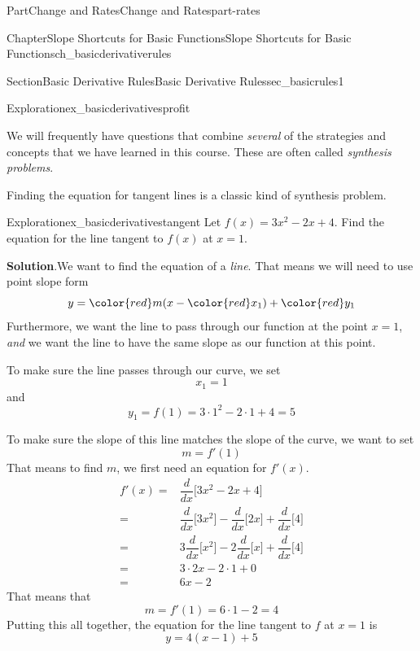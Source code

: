 \documentclass[oneside,10pt,]{tufte-book}
\newcommand{\blocktitlefont}{\relax}
\numberwithin{equation}{chapter}
\newcommand{\red}[1]{   {\color{red}   #1}   }
\newcommand{\ddx}[1]{ \dfrac{d}{dx} \Big[ #1 \Big]  }
\newcommand{\amp}{&}
\begin{document}
\begin{partptx}{Part}{Change and Rates}{}{Change and Rates}{}{}{part-rates}
\begin{chapterptx}{Chapter}{Slope Shortcuts for Basic Functions}{}{Slope Shortcuts for Basic Functions}{}{}{ch_basicderivativerules}
\begin{sectionptx}{Section}{Basic Derivative Rules}{}{Basic Derivative Rules}{}{}{sec_basicrules1}
\begin{exploration}{Exploration}{}{ex_basicderivativesprofit}
\end{exploration}%
We will frequently have questions that combine \emph{several} of the strategies and concepts that we have learned in this course.  These are often called \emph{synthesis problems}.%
\par
Finding the equation for tangent lines is a classic kind of synthesis problem.%
\begin{exploration}{Exploration}{}{ex_basicderivativestangent}%
Let \(f(x) = 3x^2 - 2x + 4\). Find the equation for the line tangent to \(f(x)\) at \(x=1\).%
\par\smallskip%
\noindent\textbf{\blocktitlefont Solution}.\hypertarget{ex_basicderivativestangent-2}{}\quad{}We want to find the equation of a \emph{line}.  That means we will need to use point slope form%
\begin{equation*}
y = \red{m} (x- \red{x_1}) + \red{y_1}
\end{equation*}
Furthermore, we want the line to pass through our function at the point \(x=1\), \emph{and} we want the line to have the same slope as our function at this point.%
\par
To make sure the line passes through our curve, we set%
\begin{equation*}
x_1 = 1
\end{equation*}
and%
\begin{equation*}
y_1 = f(1) = 3\cdot 1^2 - 2\cdot 1 + 4 = 5
\end{equation*}
%
\par
To make sure the slope of this line matches the slope of the curve, we want to set%
\begin{equation*}
m = f'(1)
\end{equation*}
That means to find \(m\), we first need an equation for \(f'(x)\).%
\begin{align*}
f'(x) = \amp \ddx{ 3x^2 - 2x + 4} \\
= \amp \ddx{3x^2} - \ddx{2x} + \ddx{4} \\
= \amp 3\ddx{x^2} - 2\ddx{x} + \ddx{4} \\
= \amp 3\cdot 2x - 2\cdot 1 + 0 \\
= \amp 6x -2
\end{align*}
That means that%
\begin{equation*}
m=f'(1) = 6\cdot 1 -2 =4
\end{equation*}
Putting this all together, the equation for the line tangent to \(f\) at \(x=1 \) is%
\begin{equation*}
y = 4 (x-1) + 5
\end{equation*}

\end{exploration}
\end{sectionptx}
\end{chapterptx}
\end{partptx}
\end{document}
